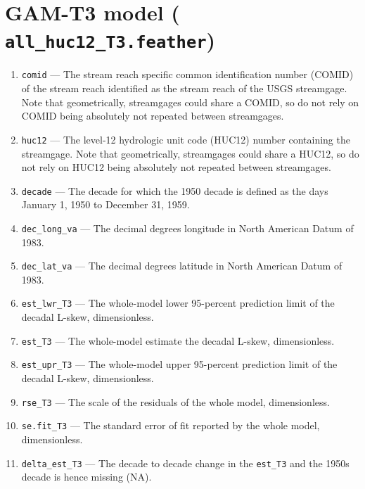 \documentclass[1p, authoryear, 11pt, times, preprint]{elsarticle}
\newcommand{\code}[1]{{\color{black}%
                       \mbox{\lstinline[basicstyle={\small\ttfamily},
                                        keywordstyle=\scriptsize\ttfamily]|#1|}}}
\begin{document}
\section{GAM-T3 model (\code{all_huc12_T3.feather})}
\begin{enumerate}
\footnotesize
\RaggedRight
\item \code{comid} --- The stream reach specific common identification number (COMID) of the stream reach identified as the stream reach of the USGS streamgage. Note that geometrically, streamgages could share a COMID, so do not rely on COMID being absolutely not repeated between streamgages.
\item \code{huc12} --- The level-12 hydrologic unit code (HUC12) number containing the streamgage. Note that geometrically, streamgages could share a HUC12, so do not rely on HUC12 being absolutely not repeated between streamgages.
\item \code{decade} --- The decade for which the 1950 decade is defined as the days January 1, 1950 to December 31, 1959.
\item \code{dec_long_va} --- The decimal degrees longitude in North American Datum of 1983.
\item \code{dec_lat_va} --- The decimal degrees latitude in North American Datum of 1983.
\item \code{est_lwr_T3} --- The whole-model lower 95-percent prediction limit of the decadal L-skew, dimensionless.
\item \code{est_T3} --- The whole-model estimate the decadal L-skew, dimensionless.
\item \code{est_upr_T3} --- The whole-model upper 95-percent prediction limit of the decadal L-skew, dimensionless.
\item \code{rse_T3} --- The scale of the residuals of the whole model, dimensionless.
\item \code{se.fit_T3} --- The standard error of fit reported by the whole model, dimensionless.
\item \code{delta_est_T3} --- The decade to decade change in the \code{est_T3} and the 1950s decade is hence missing (NA).
\end{enumerate}

 
\end{document}
